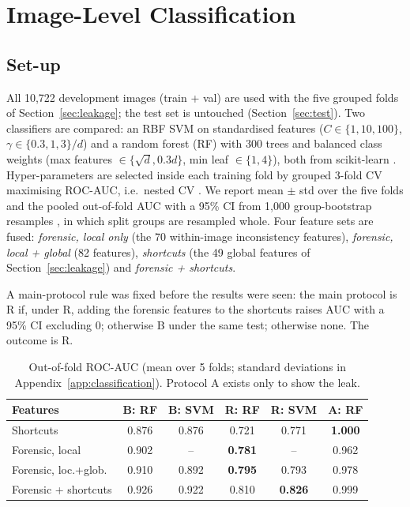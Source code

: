 \section{Image-Level Classification}\label{sec:classification}

\subsection{Set-up}\label{sec:classification-setup}
All 10,722 development images (train + val) are used with the five grouped folds of Section~\ref{sec:leakage}; the test set is untouched (Section~\ref{sec:test}). Two classifiers are compared: an RBF SVM \cite{cortes1995svm} on standardised features ($C \in \{1, 10, 100\}$, $\gamma \in \{0.3, 1, 3\}/d$) and a random forest (RF) \cite{breiman2001rf} with 300 trees and balanced class weights (max features $\in \{\sqrt{d}, 0.3d\}$, min leaf $\in \{1, 4\}$), both from scikit-learn \cite{pedregosa2011sklearn}. Hyper-parameters are selected inside each training fold by grouped 3-fold CV maximising ROC-AUC, i.e.\ nested CV \cite{cawley2010nested}. We report mean $\pm$ std over the five folds and the pooled out-of-fold AUC with a 95\% CI from 1,000 group-bootstrap resamples \cite{efron1993bootstrap}, in which split groups are resampled whole. Four feature sets are fused: \emph{forensic, local only} (the 70 within-image inconsistency features), \emph{forensic, local + global} (82 features), \emph{shortcuts} (the 49 global features of Section~\ref{sec:leakage}) and \emph{forensic + shortcuts}.

A main-protocol rule was fixed before the results were seen: the main protocol is R if, under R, adding the forensic features to the shortcuts raises AUC with a 95\% CI excluding 0; otherwise B under the same test; otherwise none. The outcome is R.

\begin{table}[!t]
\centering
\caption{Out-of-fold ROC-AUC (mean over 5 folds; standard deviations in Appendix~\ref{app:classification}). Protocol A exists only to show the leak.}
\label{tab:cls-auc}
\footnotesize
\setlength{\tabcolsep}{4pt}
\begin{tabular}{lccccc}
\toprule
Features & B: RF & B: SVM & R: RF & R: SVM & A: RF \\
\midrule
Shortcuts & 0.876 & 0.876 & 0.721 & 0.771 & \textbf{1.000} \\
Forensic, local & 0.902 & -- & \textbf{0.781} & -- & 0.962 \\
Forensic, loc.+glob. & 0.910 & 0.892 & \textbf{0.795} & 0.793 & 0.978 \\
Forensic + shortcuts & 0.926 & 0.922 & 0.810 & \textbf{0.826} & 0.999 \\
\bottomrule
\end{tabular}
\end{table}

